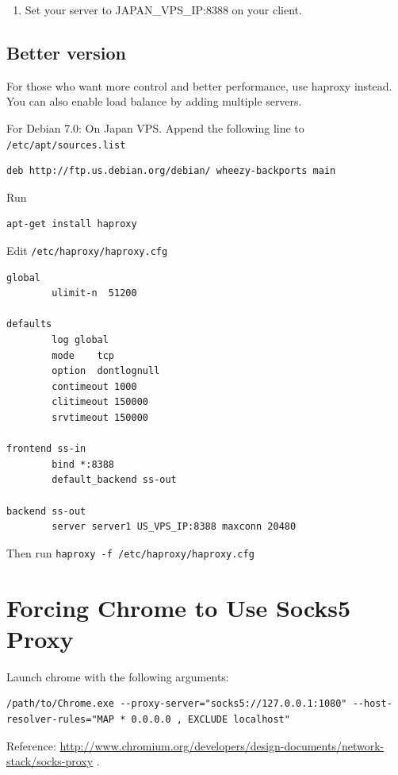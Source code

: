\documentclass[11pt,a4paper]{sphinxmanual}
\begin{document}
\begin{enumerate}
\item Set your server to JAPAN\_VPS\_IP:8388 on your client.
\end{enumerate}

\subsection{Better version}
\label{sec-6-5-2}
For those who want more control and better performance, use haproxy instead. You can also enable load balance by adding multiple servers.

For Debian 7.0:
On Japan VPS. Append the following line to \verb~/etc/apt/sources.list~

\begin{Verbatim}
deb http://ftp.us.debian.org/debian/ wheezy-backports main
\end{Verbatim}

Run
\begin{Verbatim}
apt-get install haproxy
\end{Verbatim}

Edit \verb~/etc/haproxy/haproxy.cfg~
\begin{Verbatim}
global
        ulimit-n  51200

defaults
        log global
        mode    tcp
        option  dontlognull
        contimeout 1000
        clitimeout 150000
        srvtimeout 150000

frontend ss-in
        bind *:8388
        default_backend ss-out

backend ss-out
        server server1 US_VPS_IP:8388 maxconn 20480
\end{Verbatim}

Then run \verb~haproxy -f /etc/haproxy/haproxy.cfg~


\section{Forcing Chrome to Use Socks5 Proxy}
\label{sec-6-6}
Launch chrome with the following arguments:

\begin{Verbatim}
/path/to/Chrome.exe --proxy-server="socks5://127.0.0.1:1080" --host-resolver-rules="MAP * 0.0.0.0 , EXCLUDE localhost"
\end{Verbatim}

Reference: \href{http://www.chromium.org/developers/design-documents/network-stack/socks-proxy}{\url{http://www.chromium.org/developers/design-documents/network-stack/socks-proxy}} .
\end{document}
